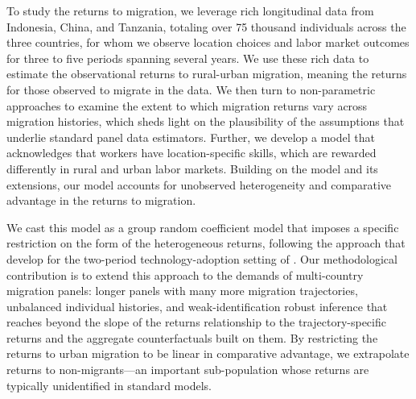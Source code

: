 \documentclass[12pt]{article}
\begin{document}
To study the returns to migration, we leverage rich longitudinal data from Indonesia, China, and Tanzania, totaling over 75 thousand individuals across the three countries, for whom we observe location choices and labor market outcomes for three to five periods spanning several years.
We use these rich data to estimate the observational returns to rural-urban migration, meaning the returns for those observed to migrate in the data.
We then turn to non-parametric approaches to examine the extent to which migration returns vary across migration histories, which sheds light on the plausibility of the assumptions that underlie standard panel data estimators. 
Further, we develop a model that acknowledges that workers have location-specific skills, which are rewarded differently in rural and urban labor markets.
Building on the \cite{royThoughtsDistributionEarnings1951} model and its extensions, our model accounts for unobserved heterogeneity and comparative advantage in the returns to migration.

We cast this model as a group random coefficient model that imposes a specific restriction on the form of the heterogeneous returns, following the approach that \cite{tjernstromCommentSuri2011} develop for the two-period technology-adoption setting of \cite{suriSelectionComparativeAdvantage2011}.
Our methodological contribution is to extend this approach to the demands of multi-country migration panels: longer panels with many more migration trajectories, unbalanced individual histories, and weak-identification robust inference that reaches beyond the slope of the returns relationship to the trajectory-specific returns and the aggregate counterfactuals built on them.
By restricting the returns to urban migration to be linear in comparative advantage, we extrapolate returns to non-migrants---an important sub-population whose returns are typically unidentified in standard models.

\end{document}
